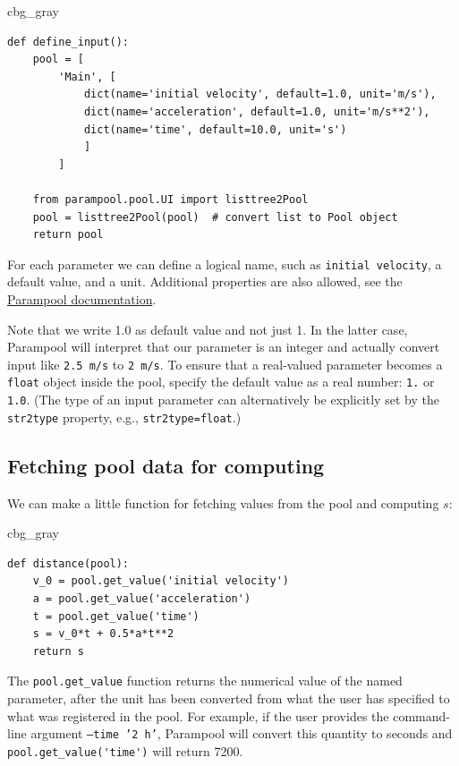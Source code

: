 \documentclass[graybox,envcountchap,sectrefs,final]{svmonodo}
\newenvironment{_cod_tight}[1]{
   \def\FrameCommand{\colorbox{#1}}
   \FrameRule0.6pt\MakeFramed {\FrameRestore}\vskip3mm}
   {\vskip0mm\endMakeFramed}
\newenvironment{cod}[1]{
\bgroup\rmfamily
\fboxsep=0mm\relax
\begin{_cod_tight}{#1}
\list{}{\parsep=-2mm\parskip=0mm\topsep=0pt\leftmargin=2mm
\rightmargin=2\leftmargin\leftmargin=4pt\relax}
\item\relax}
{\endlist\end{_cod_tight}\egroup}
\newenvironment{notice_mdfboxadmon}[1][]{
\begin{notice_mdfboxmdframed}[frametitle=#1]
}
{
\end{notice_mdfboxmdframed}
}
\begin{document}
\begin{cod}{cbg_gray}\begin{Verbatim}[numbers=none,fontsize=\fontsize{9pt}{9pt},baselinestretch=0.95,xleftmargin=2mm]
def define_input():
    pool = [
        'Main', [
            dict(name='initial velocity', default=1.0, unit='m/s'),
            dict(name='acceleration', default=1.0, unit='m/s**2'),
            dict(name='time', default=10.0, unit='s')
            ]
        ]

    from parampool.pool.UI import listtree2Pool
    pool = listtree2Pool(pool)  # convert list to Pool object
    return pool
\end{Verbatim}
\end{cod}
\noindent
For each parameter we can define a logical name, such as \texttt{initial velocity},
a default value, and a unit. Additional properties
are also allowed, see the \href{{http://hplgit.github.io/parampool/doc/web/index.html}}{Parampool documentation}.


\begin{notice_mdfboxadmon}
Note that we write 1.0 as default value and not just 1.
In the latter case, Parampool will interpret that our parameter is
an integer and actually convert input like \texttt{2.5 m/s} to \texttt{2 m/s}.
To ensure that a real-valued parameter becomes a \texttt{float} object inside
the pool, specify the default value as a real number: \texttt{1.} or \texttt{1.0}.
(The type of an input parameter can alternatively be explicitly set by
the \texttt{str2type} property, e.g., \texttt{str2type=float}.)
\end{notice_mdfboxadmon}



\subsection{Fetching pool data for computing}

We can make a little function for fetching values from the pool
and computing $s$:

\begin{cod}{cbg_gray}\begin{Verbatim}[numbers=none,fontsize=\fontsize{9pt}{9pt},baselinestretch=0.95,xleftmargin=2mm]
def distance(pool):
    v_0 = pool.get_value('initial velocity')
    a = pool.get_value('acceleration')
    t = pool.get_value('time')
    s = v_0*t + 0.5*a*t**2
    return s
\end{Verbatim}
\end{cod}
\noindent
The \Verb!pool.get_value! function returns the numerical value of
the named parameter, after the unit has been converted from what the
user has specified to what was registered in the pool.
For example, if the user provides the command-line argument
\texttt{--time '2 h'}, Parampool will convert this quantity to seconds and
\Verb!pool.get_value('time')! will return 7200.
\end{document}
